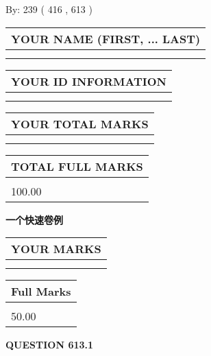 \documentclass{ctexart}
\begin{document}
   
\hspace{1.0in} By: 
 239 ( 416 ,  613 )
   
   
   
   
\newpage 
\setcounter{page}{ 
   613001 } 
   
   
   
   
\noindent\begin{tabular}{|l|}
\hline
YOUR NAME (FIRST, ... LAST)  \\
\hline
 \\ 
 \\ 
\hline
\end{tabular}
\hspace{0.05in} \begin{tabular}{|l|}
\hline
 YOUR   ID   INFORMATION  \\
\hline
 \\ 
 \\ 
\hline
\end{tabular}
   
   
\vspace{0.2in}\noindent\begin{tabular}{|l|}
\hline
YOUR TOTAL MARKS  \\
\hline
 \\ 
 \\ 
\hline
\end{tabular}
\hspace{0.05in} \begin{tabular}{|l|}
\hline
TOTAL FULL MARKS  \\
\hline
 \\ 
100.00 \\
\hline
\end{tabular}
   
   
 \vspace{0.2in}
{\LARGE {\textbf{ 一个快速卷例}}}
   
   
  
\vspace{0.2in}
  
\noindent\begin{tabular}{|l|}
\hline
 YOUR MARKS  \\
\hline
 \\ 
 \\ 
\hline
\end{tabular}
\hspace{0.05in} \begin{tabular}{|l|}
\hline
 Full Marks  \\
\hline
 \\ 
50.00 \\
\hline
\end{tabular}
{\textbf{\Large{QUESTION
613.1 
}}}
  
\end{document}
